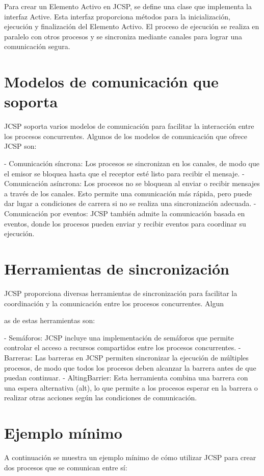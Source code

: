 Para crear un Elemento Activo en JCSP, se define una clase que implementa la interfaz Active. Esta interfaz proporciona métodos para la inicialización, ejecución y finalización del Elemento Activo. El proceso de ejecución se realiza en paralelo con otros procesos y se sincroniza mediante canales para lograr una comunicación segura.

\section*{Modelos de comunicación que soporta}
JCSP soporta varios modelos de comunicación para facilitar la interacción entre los procesos concurrentes. Algunos de los modelos de comunicación que ofrece JCSP son:

- Comunicación síncrona: Los procesos se sincronizan en los canales, de modo que el emisor se bloquea hasta que el receptor esté listo para recibir el mensaje.
- Comunicación asíncrona: Los procesos no se bloquean al enviar o recibir mensajes a través de los canales. Esto permite una comunicación más rápida, pero puede dar lugar a condiciones de carrera si no se realiza una sincronización adecuada.
- Comunicación por eventos: JCSP también admite la comunicación basada en eventos, donde los procesos pueden enviar y recibir eventos para coordinar su ejecución.

\section*{Herramientas de sincronización}
JCSP proporciona diversas herramientas de sincronización para facilitar la coordinación y la comunicación entre los procesos concurrentes. Algun

as de estas herramientas son:

- Semáforos: JCSP incluye una implementación de semáforos que permite controlar el acceso a recursos compartidos entre los procesos concurrentes.
- Barreras: Las barreras en JCSP permiten sincronizar la ejecución de múltiples procesos, de modo que todos los procesos deben alcanzar la barrera antes de que puedan continuar.
- AltingBarrier: Esta herramienta combina una barrera con una espera alternativa (alt), lo que permite a los procesos esperar en la barrera o realizar otras acciones según las condiciones de comunicación.

\section*{Ejemplo mínimo}
A continuación se muestra un ejemplo mínimo de cómo utilizar JCSP para crear dos procesos que se comunican entre sí:

